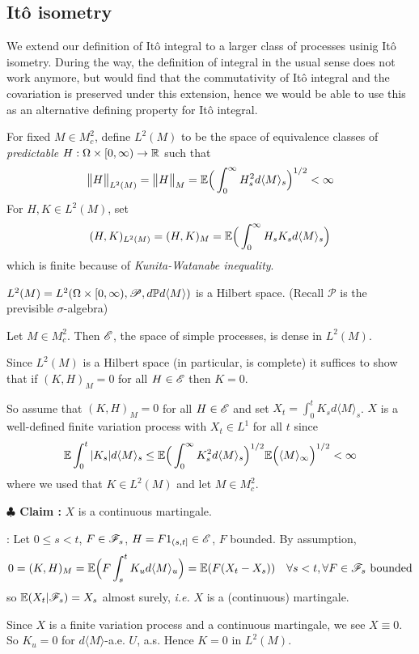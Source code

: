 \documentclass[12pt,a4paper]{article}
\newenvironment{proof}
{\begin{changemargin}{0.5cm}{0.5cm} 
	}%
	{\end{changemargin}
}
\newenvironment{subproof}
{\begin{changemargin}{0.5cm}{0.5cm} 
	}%
	{\end{changemargin}
}
\newenvironment{p}
{\begin{proof} 
	}%
	{\end{proof}
}
\begin{document}
\subsection{It\^o isometry}

We extend our definition of It\^o integral to a larger class of processes usinig It\^o isometry. During the way, the definition of integral in the usual sense does not work anymore, but would find that the commutativity of It\^o integral and the covariation is preserved under this extension, hence we would be able to use this as an alternative defining property for It\^o integral.
\s

 For fixed $M\in M_c^2$, define $L^2(M)$ to be the space of equivalence classes of \emph{predictable} $H: \Omega \times [0, \infty) \rightarrow \mathbb{R}$ such that
\begin{align*}
\bigl\lVert H\bigr\rVert_{L^2(M)} = \bigl\lVert H\bigr\rVert_{M} = \mathbb{E} \Big( \int_0^{\infty} H_s^2 d\langle M \rangle_s \Big)^{1/2} < \infty
\end{align*}
For $H, K \in L^2(M)$, set
\begin{align*}
(H, K)_{L^2(M)} = (H, K)_M = \mathbb{E} \Big(\int_0^{\infty} H_s K_s d\langle M \rangle_s \Big)
\end{align*}
which is finite because of \emph{Kunita-Watanabe inequality}.
\s

\fact $L^2(M) = L^2(\Omega \times [0, \infty), \mathscr{P}, d\mathbb{P} d\langle M \rangle)$ is a Hilbert space. (Recall $\mathscr{P}$ is the previsible $\sigma$-algebra)
\s

\prop Let $M\in M_c^2$. Then $\mathscr{E}$, the space of simple processes, is dense in $L^2(M)$.
\begin{p}
\pf Since $L^2(M)$ is a Hilbert space (in particular, is complete) it suffices to show that if $(K, H)_M =0$ for all $H\in \mathscr{E}$ then $K=0$.

\quad So assume that $(K, H)_M =0$ for all $H\in \mathscr{E}$ and set $X_t = \int_0^t K_s d\langle M \rangle_s$. $X$ is a well-defined finite variation process with $X_t \in L^1$ for all $t$ since 
\begin{align*}
\mathbb{E} \int_0^t |K_s| d\langle M \rangle_s \leq \mathbb{E} \Big( \int_0^{\infty} K_s^2 d\langle M \rangle_s \Big)^{1/2} \mathbb{E} \Big( \langle M \rangle_{\infty} \Big)^{1/2} < \infty
\end{align*}
where we used that $K\in L^2(M)$ and let $M\in M_c^2$.

\textbf{$\clubsuit$ Claim :} $X$ is a continuous martingale.
\begin{subproof}
: Let $0\leq s <t$, $F\in \mathscr{F}_s$, $H= F1_{(s,t]} \in \mathscr{E}$, $F$ bounded. By assumption,
\begin{align*}
0 = (K, H)_M = \mathbb{E} \Big( F\int_s^t K_u d\langle M \rangle_u \Big) = \mathbb{E} (F(X_t -X_s)) \quad \forall s<t, \forall F\in \mathscr{F}_s \text{ bounded}
\end{align*}
so $\mathbb{E} (X_t |\mathscr{F}_s) = X_s$ almost surely, \textit{i.e.} $X$ is a (continuous) martingale. 
\end{subproof}
Since $X$ is a finite variation process and a continuous martingale, we see $X\equiv 0$. So $K_u =0$ for $d\langle M \rangle$-a.e. $U$, a.s. Hence $K=0$ in $L^2(M)$.

\eop
\end{p}
\s
\end{document}
